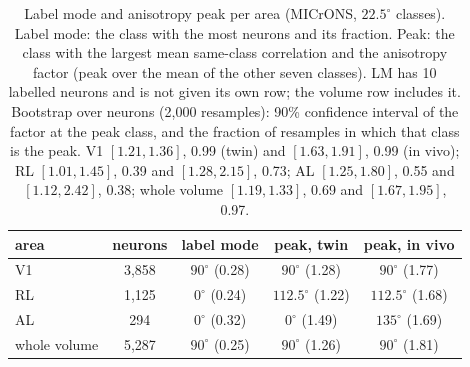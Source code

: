 \documentclass[11pt]{article}
\begin{document}
\begin{table}[htbp]
  \centering\footnotesize
  \caption{Label mode and anisotropy peak per area (MICrONS, $22.5^\circ$ classes). Label mode: the class with the most neurons and its fraction. Peak: the class with the largest mean same-class correlation and the anisotropy factor (peak over the mean of the other seven classes). LM has 10 labelled neurons and is not given its own row; the volume row includes it. Bootstrap over neurons (2,000 resamples): 90\% confidence interval of the factor at the peak class, and the fraction of resamples in which that class is the peak. V1 $[1.21, 1.36]$, 0.99 (twin) and $[1.63, 1.91]$, 0.99 (in vivo); RL $[1.01, 1.45]$, 0.39 and $[1.28, 2.15]$, 0.73; AL $[1.25, 1.80]$, 0.55 and $[1.12, 2.42]$, 0.38; whole volume $[1.19, 1.33]$, 0.69 and $[1.67, 1.95]$, 0.97.}
  \label{tab:areas}
  \begin{tabular}{lcccc}
    \toprule
    area & neurons & label mode & peak, twin & peak, in vivo \\
    \midrule
    V1 & 3,858 & $90^\circ$ (0.28) & $90^\circ$ (1.28) & $90^\circ$ (1.77) \\
    RL & 1,125 & $0^\circ$ (0.24) & $112.5^\circ$ (1.22) & $112.5^\circ$ (1.68) \\
    AL & 294 & $0^\circ$ (0.32) & $0^\circ$ (1.49) & $135^\circ$ (1.69) \\
    whole volume & 5,287 & $90^\circ$ (0.25) & $90^\circ$ (1.26) & $90^\circ$ (1.81) \\
    \bottomrule
  \end{tabular}
\end{table}
\end{document}
